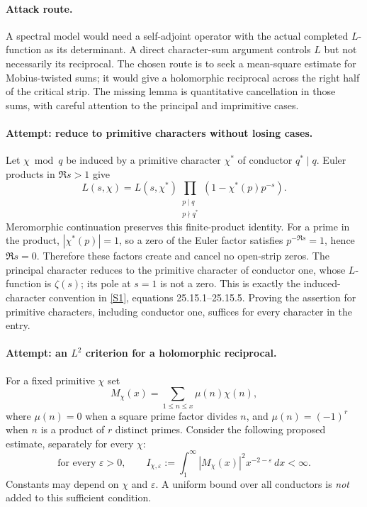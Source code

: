\documentclass[11pt,a4paper]{article}
\newcommand{\sref}[2]{\hyperlink{source:#1:#2}{[S#2]}}
\begin{document}
\paragraph{Attack route.}
A spectral model would need a self-adjoint operator with the actual
completed $L$-function as its determinant. A direct character-sum argument
controls $L$ but not necessarily its reciprocal. The chosen route is to
seek a mean-square estimate for Mobius-twisted sums; it would give a
holomorphic reciprocal across the right half of the critical strip.
The missing lemma is quantitative cancellation in those sums, with
careful attention to the principal and imprimitive cases.

\paragraph{Attempt: reduce to primitive characters without losing cases.}
Let $\chi\bmod q$ be induced by a primitive character $\chi^*$ of
conductor $q^*\mid q$. Euler products in $\Re s>1$ give
\[
 L(s,\chi)=L(s,\chi^*)
       \prod_{\substack{p\mid q\\p\nmid q^*}}
                  (1-\chi^*(p)p^{-s}). \tag{9.1}
\]
Meromorphic continuation preserves this finite-product identity.
For a prime in the product, $|\chi^*(p)|=1$, so a zero of the Euler
factor satisfies $p^{-\Re s}=1$, hence $\Re s=0$.
Therefore these factors create and cancel no open-strip zeros.
The principal character reduces to the primitive character of conductor
one, whose $L$-function is $\zeta(s)$; its pole at $s=1$ is not a zero.
This is exactly the induced-character convention in \sref{statement}{1},
equations 25.15.1--25.15.5. Proving the assertion for primitive characters,
including conductor one, suffices for every character in the entry.

\paragraph{Attempt: an $L^2$ criterion for a holomorphic reciprocal.}
For a fixed primitive $\chi$ set
\[
 M_\chi(x)=\sum_{1\leq n\leq x}\mu(n)\chi(n),
\]
where $\mu(n)=0$ when a square prime factor divides $n$, and
$\mu(n)=(-1)^r$ when $n$ is a product of $r$ distinct primes.
Consider the following proposed estimate, separately for every $\chi$:
\[
 \text{for every }\varepsilon>0,\qquad
 I_{\chi,\varepsilon}:=
    \int_1^\infty |M_\chi(x)|^2x^{-2-\varepsilon}\,dx<\infty.
 \tag{9.2}
\]
Constants may depend on $\chi$ and $\varepsilon$. A uniform bound over
all conductors is \emph{not} added to this sufficient condition.
\end{document}
